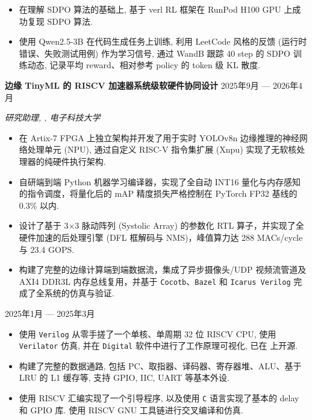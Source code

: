 \begin{itemize}
    \item 在理解 SDPO 算法的基础上, 基于 verl RL 框架在 RunPod H100 GPU 上成功复现 SDPO 算法.
    \item 使用 Qwen2.5-3B 在代码生成任务上训练, 利用 LeetCode 风格的反馈 (运行时错误、失败测试用例) 作为学习信号, 通过 WandB 跟踪 40 step 的 SDPO 训练动态, 记录平均 reward、相对参考 policy 的 token 级 KL 散度.
\end{itemize}

\textbf{边缘 TinyML 的 RISCV 加速器系统级软硬件协同设计} \hfill 2025年9月 --- 2026年4月

\vspace{-0.2em} \begin{small} \textit{研究助理, , 电子科技大学} \end{small} \vspace{-0.2em}

\begin{itemize}
    \item 在 Artix-7 FPGA 上独立架构并开发了用于实时 YOLOv8n 边缘推理的神经网络处理单元 (NPU), 通过自定义 RISC-V 指令集扩展 (Xnpu) 实现了无软核处理器的纯硬件执行架构.
    \item 自研端到端 Python 机器学习编译器，实现了全自动 INT16 量化与内存感知的指令调度，将量化后的 mAP 精度损失严格控制在 PyTorch FP32 基线的 0.3\% 以内.
    \item 设计了基于 3×3 脉动阵列 (Systolic Array) 的参数化 RTL 算子，并实现了全硬件加速的后处理引擎 (DFL 框解码与 NMS)，峰值算力达 288 MACs/cycle 与 23.4 GOPS.
    \item 构建了完整的边缘计算端到端数据流，集成了异步摄像头/UDP 视频流管道及 AXI4 DDR3L 内存总线复用，并基于 \texttt{Cocotb}、\texttt{Bazel} 和 \texttt{Icarus Verilog} 完成了全系统的仿真与验证.
\end{itemize}

 \hfill 2025年1月 --- 2025年3月

\begin{itemize}
    \item 使用 \texttt{Verilog} 从零手搓了一个单核、单周期 32 位 RISCV CPU, 使用 \texttt{Verilator} 仿真, 并在 \texttt{Digital} 软件中进行了工作原理可视化, 已在  上开源.
    \item 构建了完整的数据通路, 包括 PC、取指器、译码器、寄存器堆、ALU、基于 LRU 的 L1 缓存等, 支持 GPIO, IIC, UART 等基本外设.
    \item 使用 RISCV 汇编实现了一个引导程序, 以及使用 \texttt{C} 语言实现了基本的 delay 和 GPIO 库. 使用 RISCV GNU 工具链进行交叉编译和仿真.
\end{itemize}


